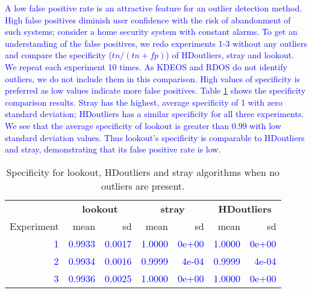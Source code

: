 \documentclass[12pt]{article}
\theoremstyle{definition}
\theoremstyle{definition}
\theoremstyle{definition}
\theoremstyle{definition}
\theoremstyle{remark}
\begin{document}
\textcolor{blue}{
A low false positive rate is an attractive feature for an outlier detection method. High false positives diminish user confidence with the risk of abandonment of such systems; consider a home security system with constant alarms. To get an understanding of the false positives, we redo experiments 1-3 without any outliers and compare the specificity ($tn/(tn+fp)$) of HDoutliers, stray and lookout. We repeat each experiment 10 times. As KDEOS and RDOS do not identify outliers, we do not include them in this comparison. High values of specificity is preferred as low values indicate more false positives. Table \ref{tab:zerooutliers} shows the specificity comparison results. Stray has the highest, average specificity of 1 with zero standard deviation;  HDoutliers has a similar specificity for all three experiments. We see that the average specificity of lookout is greater than $0.99$ with low standard deviation values. Thus lookout's specificity is comparable to HDoutliers and stray, demonstrating that its false positive rate is low. }

\begin{table}

\caption{\label{tab:zerooutliers}Specificity for lookout, HDoutliers and stray algorithms when no outliers are present.}
\centering
\begin{tabular}[t]{rrrrrrr}
\toprule
\multicolumn{1}{c}{\textbf{}} & \multicolumn{2}{c}{\textbf{lookout}} & \multicolumn{2}{c}{\textbf{stray}} & \multicolumn{2}{c}{\textbf{HDoutliers}} \\
\cmidrule(l{3pt}r{3pt}){2-3} \cmidrule(l{3pt}r{3pt}){4-5} \cmidrule(l{3pt}r{3pt}){6-7}
Experiment & mean & sd & mean & sd & mean & sd\\
\midrule
\textcolor{blue}{1} & \textcolor{blue}{0.9933} & \textcolor{blue}{0.0017} & \textcolor{blue}{1.0000} & \textcolor{blue}{0e+00} & \textcolor{blue}{1.0000} & \textcolor{blue}{0e+00}\\
\textcolor{blue}{2} & \textcolor{blue}{0.9934} & \textcolor{blue}{0.0016} & \textcolor{blue}{0.9999} & \textcolor{blue}{4e-04} & \textcolor{blue}{0.9999} & \textcolor{blue}{4e-04}\\
\textcolor{blue}{3} & \textcolor{blue}{0.9936} & \textcolor{blue}{0.0025} & \textcolor{blue}{1.0000} & \textcolor{blue}{0e+00} & \textcolor{blue}{1.0000} & \textcolor{blue}{0e+00}\\
\bottomrule
\end{tabular}
\end{table}
\end{document}
